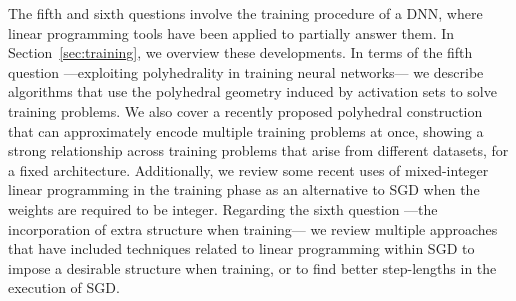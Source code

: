 The fifth and sixth questions involve the training procedure of a DNN, where linear programming tools have been applied to partially answer them. In Section~\ref{sec:training}, we overview these developments. In terms of the fifth question ---exploiting polyhedrality in training neural networks--- we describe algorithms that use the polyhedral geometry induced by activation sets to solve training problems. We also cover a recently proposed polyhedral construction that can approximately encode multiple training problems at once, showing a strong relationship across training problems that arise from different datasets, for a fixed architecture. Additionally, we review some recent uses of mixed-integer linear programming in the training phase as an alternative to SGD when the weights are required to be integer. Regarding the sixth question ---the incorporation of extra structure when training--- we review multiple approaches that have included techniques related to linear programming within SGD to impose a desirable structure when training, or to find better step-lengths in the execution of SGD.

